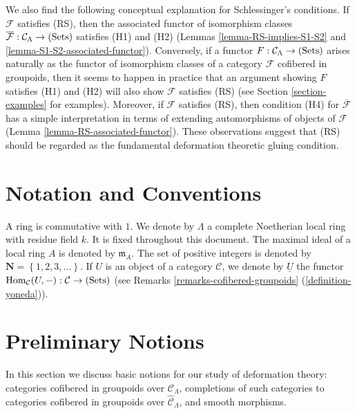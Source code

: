 \medskip \noindent
We also find the following conceptual explanation for Schlessinger's 
conditions.  If $\mathcal F$ satisfies (RS), then the associated functor of 
isomorphism classes $\overline{\mathcal F}: \mathcal C_{\Lambda} \rightarrow 
\textnormal{(Sets)}$ satisfies (H1) and (H2) (Lemmas 
\ref{lemma-RS-implies-S1-S2} and \ref{lemma-S1-S2-associated-functor}).  
Conversely, if a functor $F: \mathcal C_{\Lambda} \rightarrow 
\textnormal{(Sets)}$ arises naturally as the functor of isomorphism classes of 
a category $\mathcal F$ cofibered in groupoids, then it seems to happen in 
practice that an argument showing $F$ satisfies (H1) and (H2) will also show 
$\mathcal F$ satisfies (RS) (see Section \ref{section-examples} for examples).  
Moreover, if $\mathcal F$ satisfies (RS), then condition (H4) for 
$\overline{\mathcal F}$ has a simple interpretation in terms of extending 
automorphisms of objects of $\mathcal F$ (Lemma 
\ref{lemma-RS-associated-functor}).  These observations suggest that (RS) 
should be regarded as the fundamental deformation theoretic gluing condition.




\section{Notation and Conventions}
\label{section-notations-conventions}

\noindent
A ring is commutative with $1$. We denote by $\Lambda$ a complete Noetherian 
local ring with residue field $k$.  It is fixed throughout this document.  The 
maximal ideal of a local ring $A$ is denoted by $\mathfrak{m}_{A}$. The set of 
positive integers is denoted by $\mathbf{N} = \left\{1,2,3,\dots \right\}$.
If $U$ is an object of a category $\mathcal C$, we denote by $\underline{U}$ 
the functor $\textnormal{Hom}_{\mathcal C}(U,-): \mathcal C \rightarrow 
\textnormal{(Sets)}$ (see Remarks \ref{remarks-cofibered-groupoids} 
(\ref{definition-yoneda})).




\section{Preliminary Notions}
\label{section-preliminary}

\noindent
In this section we discuss basic notions for our study of deformation theory: 
categories cofibered in groupoids over $\mathcal C_{\Lambda}$, completions of 
such categories to categories cofibered in groupoids over $\widehat{\mathcal 
C}_{\Lambda}$, and smooth morphisms.


